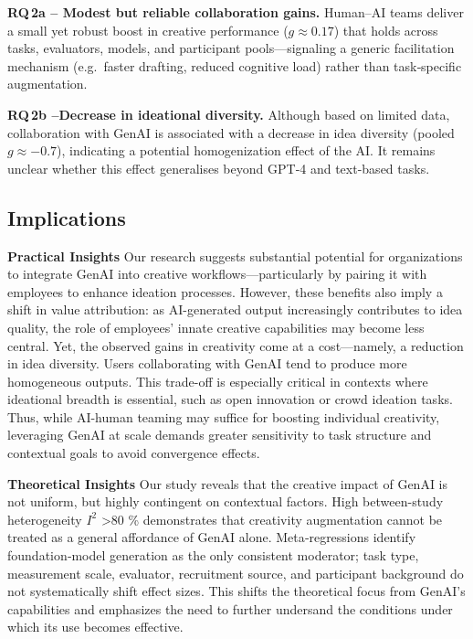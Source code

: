 \documentclass[manuscript, screen, review, acmsmall, anonymous]{acmart}
\begin{document}
\textbf{RQ\,2a – Modest but reliable collaboration gains.} Human–AI teams deliver a small yet robust boost in creative performance ($g\approx 0.17$) that holds across tasks, evaluators, models, and participant pools—signaling a generic facilitation mechanism (e.g.\ faster drafting, reduced cognitive load) rather than task‑specific augmentation.

\textbf{RQ\,2b –Decrease in ideational diversity.} Although based on limited data, collaboration with GenAI is associated with a decrease in idea diversity (pooled $g \approx -0.7$), indicating a potential homogenization effect of the AI. It remains unclear whether this effect generalises beyond GPT‑4 and text-based tasks.


\subsection{Implications}

\textbf{Practical Insights} Our research suggests substantial potential for organizations to integrate GenAI into creative workflows—particularly by pairing it with employees to enhance ideation processes. However, these benefits also imply a shift in value attribution: as AI-generated output increasingly contributes to idea quality, the role of employees’ innate creative capabilities may become less central. Yet, the observed gains in creativity come at a cost—namely, a reduction in idea diversity. Users collaborating with GenAI tend to produce more homogeneous outputs. This trade-off is especially critical in contexts where ideational breadth is essential, such as open innovation or crowd ideation tasks. Thus, while AI-human teaming may suffice for boosting individual creativity, leveraging GenAI at scale demands greater sensitivity to task structure and contextual goals to avoid convergence effects.


\textbf{Theoretical Insights} Our study reveals that the creative impact of GenAI is not uniform, but highly contingent on contextual factors.   High between-study heterogeneity $I^{2}$ >80 \% demonstrates that creativity augmentation cannot be treated as a general affordance of GenAI alone. Meta‑regressions identify foundation‑model generation as the only consistent moderator; task type, measurement scale, evaluator, recruitment source, and participant background do not systematically shift effect sizes. This shifts the theoretical focus from GenAI’s capabilities and emphasizes the need to further undersand the conditions under which its use becomes effective.
\end{document}
